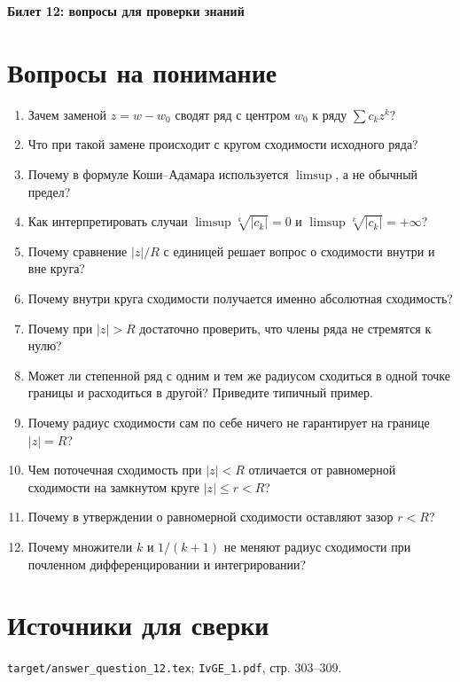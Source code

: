 \documentclass[12pt,a4paper]{article}
\begin{document}
\begin{center}
{\Large\bfseries Билет 12: вопросы для проверки знаний}
\end{center}

\noindent{}

\section*{Вопросы на понимание}

\begin{enumerate}
\item Зачем заменой $z=w-w_0$ сводят ряд с центром $w_0$ к ряду $\sum c_kz^k$?
\item Что при такой замене происходит с кругом сходимости исходного ряда?
\item Почему в формуле Коши--Адамара используется $\limsup$, а не обычный предел?
\item Как интерпретировать случаи $\limsup\sqrt[k]{|c_k|}=0$ и $\limsup\sqrt[k]{|c_k|}=+\infty$?
\item Почему сравнение $|z|/R$ с единицей решает вопрос о сходимости внутри и вне круга?
\item Почему внутри круга сходимости получается именно абсолютная сходимость?
\item Почему при $|z|>R$ достаточно проверить, что члены ряда не стремятся к нулю?
\item Может ли степенной ряд с одним и тем же радиусом сходиться в одной точке границы и расходиться в другой? Приведите типичный пример.
\item Почему радиус сходимости сам по себе ничего не гарантирует на границе $|z|=R$?
\item Чем поточечная сходимость при $|z|<R$ отличается от равномерной сходимости на замкнутом круге $|z|\le r<R$?
\item Почему в утверждении о равномерной сходимости оставляют зазор $r<R$?
\item Почему множители $k$ и $1/(k+1)$ не меняют радиус сходимости при почленном дифференцировании и интегрировании?
\end{enumerate}

\section*{Источники для сверки}

\texttt{target/answer\_question\_12.tex};
\texttt{IvGE\_1.pdf}, стр. 303--309.
\end{document}

